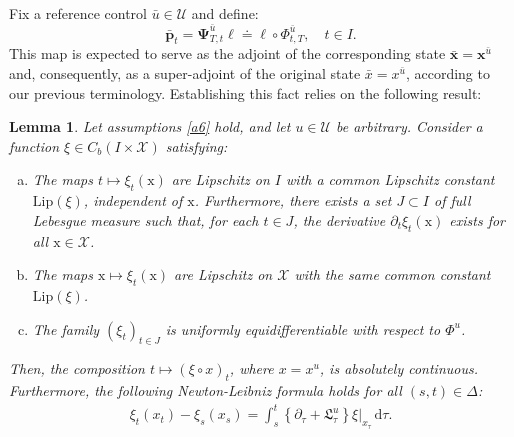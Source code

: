 \documentclass[sn-mathphys-num]{sn-jnl}
\numberwithin{equation}{section}
\theoremstyle{mythm}
\newtheorem{lemma}[proposition]{Lemma}
\theoremstyle{mydef}
\newcommand{\Lip}{\mathrm{Lip}}
\begin{document}
Fix a reference control $\bar{u} \in \mathcal{U}$ and define:
\begin{equation}
    \bar{\bm{p}}_t = \bm{\Psi}^{\bar{u}}_{T, t}\ell \doteq \ell \circ \Phi^{\bar{u}}_{t, T}, \quad t \in I.\label{p-rep}
\end{equation}
This map is expected to serve as the adjoint of the corresponding state \( \bar{\bm{x}} = \bm{x}^{\bar{u}} \) and, consequently, as a super-adjoint of the original state \( \bar x = x^{\bar u} \), according to our previous terminology. Establishing this fact relies on the following result:
\begin{lemma}\label{propos:xi}
    Let assumptions \ref{a6} hold, and let $u \in \mathcal{U}$ be arbitrary. Consider a function \( \xi \in C_b(I \times \mathcal{X}) \) satisfying:
    \begin{enumerate}[(a)]
        \item The maps \( t \mapsto \xi_t(\mathrm{x}) \) are Lipschitz on $I$ with a common Lipschitz constant \( \Lip(\xi) \), independent of $\mathrm{x}$. Furthermore, there exists a set \( J \subset I \) of full Lebesgue measure such that, for each \( t \in J \), the derivative \( \partial_t \xi_t(\mathrm{x}) \) exists for all \( \mathrm{x} \in \mathcal{X} \).
        \item The maps \( \mathrm{x} \mapsto \xi_t(\mathrm{x}) \) are Lipschitz on \( \mathcal{X} \) with the same common constant \( \Lip(\xi) \).
        \item The family \( (\xi_t)_{t \in J} \) is uniformly equidifferentiable with respect to \( \Phi^u \).
    \end{enumerate}
    Then, the composition \( t \mapsto (\xi \circ x)_t \), where \( x = x^{u} \), is absolutely continuous. Furthermore, the following Newton-Leibniz formula holds for all \( (s, t) \in \Delta \):
    \begin{align}
        \xi_t(x_t) - \xi_s(x_s) = \int_s^t \left\{ \partial_\tau + \mathfrak{L}^u_\tau \right\} \xi \big|_{x_\tau} \, \mathrm{d} \tau.\label{NL-g}
    \end{align}
\end{lemma}
\end{document}
